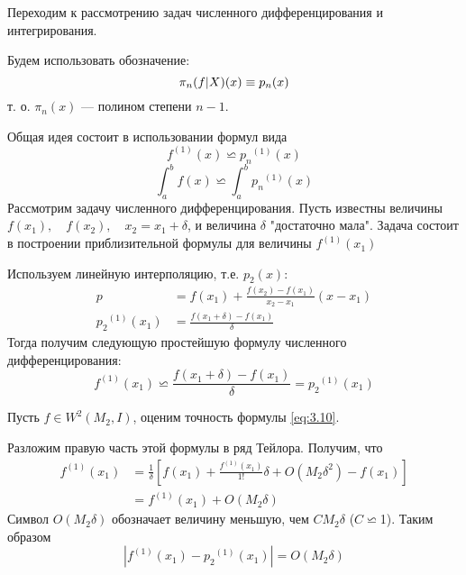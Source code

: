 \bigskip
Переходим к рассмотрению задач численного дифференцирования и интегрирования. 

Будем использовать обозначение:
\begin{equation}
	\pi_n(f|X)(x) \equiv p_n(x)\\
\end{equation}
т. о. $\pi_n(x)$ --- полином степени $n-1$.

Общая идея состоит в использовании формул вида 
\begin{equation}
	f^{(1)}(x) \backsimeq {p_n}^{(1)}(x)
\end{equation}
\begin{equation}
	\int_{a}^{b}f(x) \backsimeq \int_{a}^{b}{p_n}^{(1)}(x)
\end{equation}
Рассмотрим задачу численного дифференцирования. Пусть известны величины $f(x_1), \quad f(x_2), \quad x_2 = x_1 + \delta$, и величина $\delta$ "достаточно мала". Задача состоит в построении приблизительной формулы для величины $f^{(1)}(x_1)$

Используем линейную интерполяцию, т.е. $p_2(x)$:
\begin{equation}
	\begin{aligned}
	p &= f(x_1) + \frac{f(x_2) - f(x_1)}{x_2-x_1}(x-x_1) \\
	{p_2}^{(1)}(x_1) &= \frac{f(x_1+\delta) - f(x_1)}{\delta}
	\end{aligned}
\end{equation}
Тогда получим следующую простейшую формулу численного дифференцирования:
\begin{dmath} \label{eq:3.10}
	f^{(1)}(x_1) \backsimeq \frac{f(x_1 + \delta) - f(x_1)}{\delta} = {p_2}^{(1)}(x_1)
\end{dmath}

Пусть $f \in W^2(M_2, I)$, оценим точность формулы \ref{eq:3.10}.

Разложим правую часть этой формулы в ряд Тейлора. Получим, что
\begin{dmath} 
	\begin{aligned}
f^{(1)}(x_1) &= \frac{1}{\delta} [f(x_1) + \frac{f^{(1)}(x_1)}{1!}\delta + O(M_2\delta^2)-f(x_1)] \\
&= f^{(1)}(x_1) + O(M_2 \delta)
	\end{aligned}
\end{dmath}
Символ \textbf{$O(M_2\delta)$} обозначает величину меньшую, чем $CM_2\delta$ ($C\backsimeq$1). Таким образом
\begin{equation}
	|f^{(1)}(x_1) - {p_2}^{(1)}(x_1)| = O(M_2\delta)
\end{equation}

